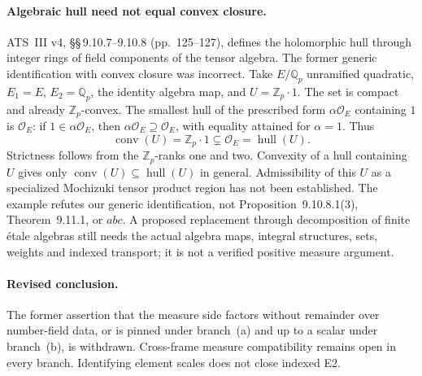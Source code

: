 \documentclass[11pt,a4paper]{article}
\theoremstyle{definition}
\theoremstyle{plain}
\theoremstyle{definition}
\begin{document}
\paragraph{Algebraic hull need not equal convex closure.}
ATS~III v4, \S\S\,9.10.7--9.10.8 (pp.~125--127), defines the holomorphic
hull through integer rings of field components of the tensor algebra.
The former generic identification with convex closure was incorrect.
Take $E/\mathbb Q_p$ unramified quadratic, $E_1=E$,
$E_2=\mathbb Q_p$, the identity algebra map, and $U=\mathbb Z_p\cdot1$.
The set is compact and already $\mathbb Z_p$-convex. The smallest hull
of the prescribed form $\alpha\mathcal O_E$ containing $1$ is
$\mathcal O_E$: if $1\in\alpha\mathcal O_E$, then
$\alpha\mathcal O_E\supseteq\mathcal O_E$, with equality attained for
$\alpha=1$. Thus
\[
 \operatorname{conv}(U)=\mathbb Z_p\cdot1
 \subsetneq\mathcal O_E=\operatorname{hull}(U).
\]
Strictness follows from the $\mathbb Z_p$-ranks one and two.
Convexity of a hull containing $U$ gives only
$\operatorname{conv}(U)\subseteq\operatorname{hull}(U)$ in general.
Admissibility of this $U$ as a specialized Mochizuki tensor product region
has not been established. The example refutes our generic identification,
not Proposition~9.10.8.1(3), Theorem~9.11.1, or $abc$.
A proposed replacement through decomposition of finite étale algebras
still needs the actual algebra maps, integral structures, sets, weights
and indexed transport; it is not a verified positive measure argument.

\paragraph{Revised conclusion.}
The former assertion that the measure side factors without remainder over
number-field data, or is pinned under branch~(a) and up to a scalar under
branch~(b), is withdrawn. Cross-frame measure compatibility remains open
in every branch. Identifying element scales does not close indexed E2.
\end{document}
